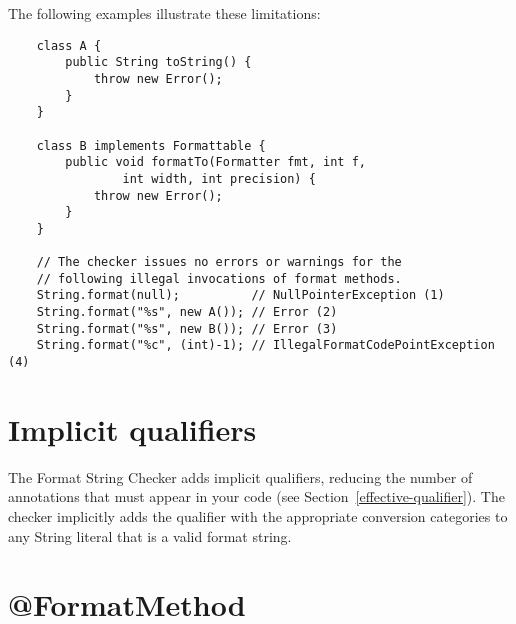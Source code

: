 \noindent The following examples illustrate these limitations:

\begin{Verbatim}
    class A {
        public String toString() {
            throw new Error();
        }
    }

    class B implements Formattable {
        public void formatTo(Formatter fmt, int f,
                int width, int precision) {
            throw new Error();
        }
    }

    // The checker issues no errors or warnings for the
    // following illegal invocations of format methods.
    String.format(null);          // NullPointerException (1)
    String.format("%s", new A()); // Error (2)
    String.format("%s", new B()); // Error (3)
    String.format("%c", (int)-1); // IllegalFormatCodePointException (4)
\end{Verbatim}

%
%


\section{Implicit qualifiers\label{formatter-implicit}}

The Format String Checker adds implicit
qualifiers, reducing the number of annotations that must appear in your code
(see Section~\ref{effective-qualifier}).
The checker implicitly adds the  qualifier with the appropriate
conversion categories to any String literal that is a valid format string.


\section{@FormatMethod\label{formatter-FormatMethod}}

